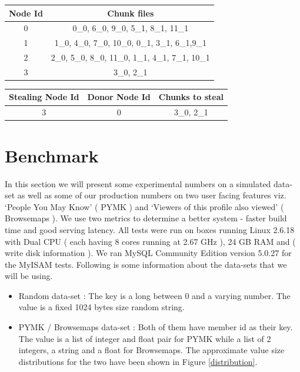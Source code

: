 \documentclass[10pt,twocolumn,preprint,natbib,authoryear]{sigplanconf}
\begin{document}
\begin{center}
    \begin{tabular}{ | c | c | }
    \hline
    Node Id & Chunk files \\ \hline
    0 &  	0\_0, 6\_0, 9\_0,      			5\_1, 8\_1, 11\_1 			\\
   	1 &   	1\_0, 4\_0, 7\_0, 10\_0,      	0\_1, 3\_1, 6\_1,9\_1  		\\
   	2 &    	2\_0, 5\_0, 8\_0, 11\_0,    	1\_1, 4\_1, 7\_1, 10\_1		\\
   	3 &   	3\_0,                         	2\_1 						\\
\hline
    \end{tabular}
\end{center}

\begin{center}
    \begin{tabular}{ | c | c | c | }
    \hline
    Stealing Node Id & Donor Node Id & Chunks to steal \\ \hline
    3 &  0 & 3\_0, 2\_1	\\
\hline
    \end{tabular}
\end{center}



\section{Benchmark}
\label{sec:benchmark}

In this section we will present some experimental numbers on a simulated data-set as well as some of our production numbers on two user facing features viz. `People You May Know' ( PYMK ) and `Viewers of this profile also viewed' ( Browsemaps ). We use two metrics to determine a better system - faster build time and good serving latency. All tests were run on boxes running Linux 2.6.18 with Dual CPU ( each having 8 cores running at 2.67 GHz ), 24 GB RAM and ( write disk information ). We ran MySQL Community Edition version 5.0.27 for the MyISAM tests. Following is some information about the data-sets that we will be using. 

\begin{itemize}
	\item Random data-set : The key is a long between 0 and a varying number. The value is a fixed 1024 bytes size random string. 
	\item PYMK / Browsemaps data-set : Both of them have member id as their key. The value is a list of integer and float pair for PYMK while a list of 2 integers, a string and a float for Browsemaps. The approximate value size distributions for the two have been shown in Figure \ref{distribution}.  
\end{itemize}
\end{document}
